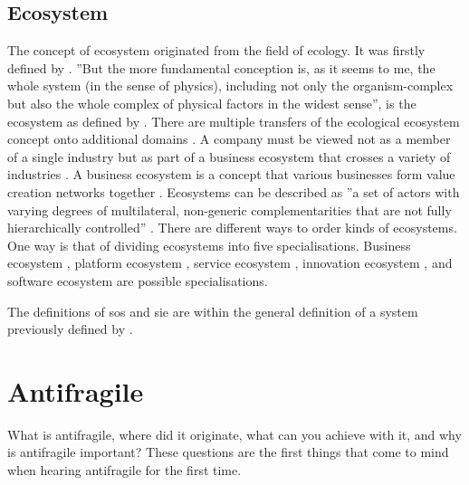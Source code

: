 \subsection{Ecosystem}
\label{sub:tbecosystem}
The concept of ecosystem originated from the field of ecology. It was firstly defined by \textcite[p.~229]{Tansley1935} \parencite[p.~19]{Rich1988}. ''But the more fundamental conception is, as it seems to me, the whole system (in the sense of physics), including not only the organism-complex but also the whole complex of physical factors in the widest sense'', is the ecosystem as defined by \textcite[p.~299]{Tansley1935}. There are multiple transfers of the ecological ecosystem concept onto additional domains \parencite[p.~3]{Guggenberger2020}. A company must be viewed not as a member of a single industry but as part of a business ecosystem that crosses a variety of industries \parencite[p.~76]{Moore1993}. A business ecosystem is a concept that various businesses form value creation networks together \parencite[p.~3]{Guggenberger2020}. Ecosystems can be described as ''a set of actors with varying degrees of multilateral, non-generic complementarities that are not fully hierarchically controlled'' \parencite[p.~2255]{Jacobides2018}. There are different ways to order kinds of ecosystems. One way is that of dividing ecosystems into five specialisations. Business ecosystem \parencite[p.~76]{Moore1993}, platform ecosystem \parencite[p.~5]{Guggenberger2020}, service ecosystem \parencites{Barros2006}{Papazoglou2006}{Huang2014}, innovation ecosystem \parencites{Iansiti2004}{Carayannis2009}{Gomes2018}, and software ecosystem \parencites{Manikas2013}[p.~5]{Guggenberger2020} are possible \glspl{specialisation}.

The definitions of \gls{sos} and \gls{sie} are within the general definition of a system previously defined by \textcites{Ackoff1973}[p.~183]{Gharajedaghi2011}[pp.~13--14]{Mannaert2016}.
\section{Antifragile}
\label{sec:tbantifragile}
What is \gls{antifragile}, where did it originate, what can you achieve with it, and why is \gls{antifragile} important? These questions are the first things that come to mind when hearing \gls{antifragile} for the first time.

